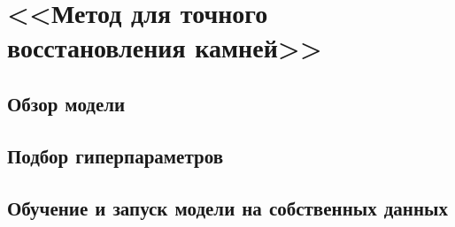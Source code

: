 \chapter{<<Метод для точного восстановления камней>>}

\section{Обзор модели}
\section{Подбор гиперпараметров}
\section{Обучение и запуск модели на собственных данных}

